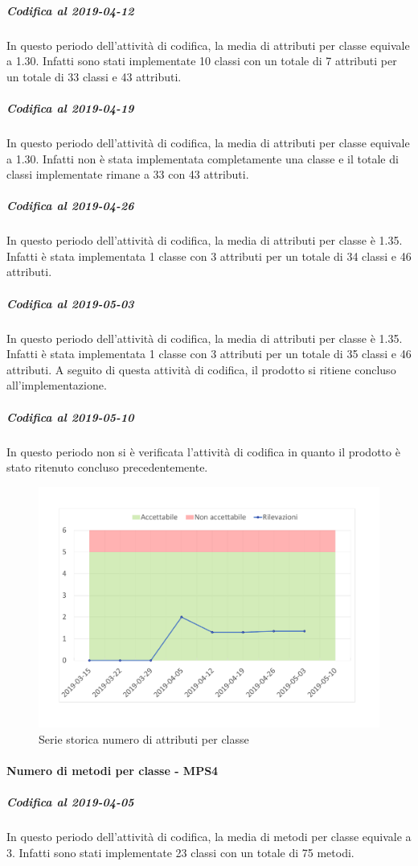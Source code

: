 \subparagraph{Codifica al 2019-04-12}
In questo periodo dell'attività di codifica, la media di attributi per classe equivale a 1.30. Infatti sono stati implementate 10 classi con un totale di 7 attributi per un totale di 33 classi e 43 attributi.

\subparagraph{Codifica al 2019-04-19}
In questo periodo dell'attività di codifica, la media di attributi per classe equivale a 1.30. Infatti non è stata implementata completamente una classe e il totale di classi implementate rimane a 33 con 43 attributi.

\subparagraph{Codifica al 2019-04-26}
In questo periodo dell'attività di codifica, la media di attributi per classe è 1.35. Infatti è stata implementata 1 classe con 3 attributi per un totale di 34 classi e 46 attributi.

\subparagraph{Codifica al 2019-05-03}
In questo periodo dell'attività di codifica, la media di attributi per classe è 1.35. Infatti è stata implementata 1 classe con 3 attributi per un totale di 35 classi e 46 attributi.
A seguito di questa attività di codifica, il prodotto si ritiene concluso all'implementazione.

\subparagraph{Codifica al 2019-05-10}
In questo periodo non si è verificata l'attività di codifica in quanto il prodotto è stato ritenuto concluso precedentemente.

\begin{figure}[H]
	\centering
	\includegraphics[scale=0.6]{images/resoconto/MPS3Chart.pdf}
	\caption{Serie storica numero di attributi per classe}	
\end{figure}

\paragraph{Numero di metodi per classe - MPS4}
\subparagraph{Codifica al 2019-04-05}
In questo periodo dell'attività di codifica, la media di metodi per classe equivale a 3. Infatti sono stati implementate 23 classi con un totale di 75 metodi.

